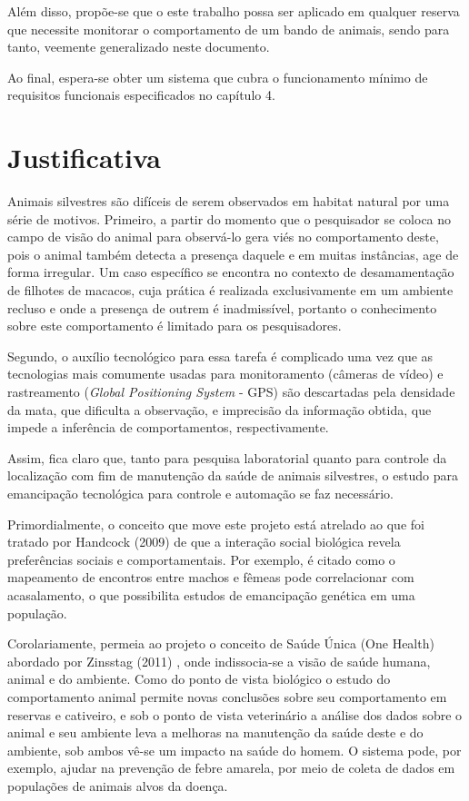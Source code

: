 Além disso, propõe-se que o este trabalho possa ser aplicado em qualquer reserva que necessite monitorar o comportamento de um bando de animais, sendo para tanto, veemente generalizado neste documento.

Ao final, espera-se obter um sistema que cubra o funcionamento mínimo de requisitos funcionais especificados no capítulo 4.

\section{Justificativa}
Animais silvestres são difíceis de serem observados em habitat natural por uma série de motivos. Primeiro, a partir do momento que o pesquisador se coloca no campo de visão do animal para observá-lo gera viés no comportamento deste, pois o animal também detecta a presença daquele e em muitas instâncias, age de forma irregular. Um caso específico se encontra no contexto de desamamentação de filhotes de macacos, cuja prática é realizada exclusivamente em um ambiente recluso e onde a presença de outrem é inadmissível, portanto o conhecimento sobre este comportamento é limitado para os pesquisadores.

Segundo, o auxílio tecnológico para essa tarefa é complicado uma vez que as tecnologias mais comumente usadas para monitoramento (câmeras de vídeo)  e rastreamento (\emph{Global Positioning System} - GPS) são descartadas pela densidade da mata, que dificulta a observação, e imprecisão da informação obtida, que impede a inferência de comportamentos, respectivamente.

Assim, fica claro que, tanto para pesquisa laboratorial quanto para controle da localização com fim de manutenção da saúde de animais silvestres, o estudo para emancipação tecnológica para controle e automação se faz necessário.

Primordialmente, o conceito que move este projeto está atrelado ao que foi tratado por Handcock (2009) \cite{handcock} de que a interação social biológica revela preferências sociais e comportamentais. Por exemplo, é citado como o mapeamento de encontros entre machos e fêmeas pode correlacionar com acasalamento, o que possibilita estudos de emancipação genética em uma população.

Corolariamente, permeia ao projeto o conceito de Saúde Única (One Health) abordado por Zinsstag (2011) \cite{zinsstag}, onde indissocia-se a visão de saúde humana, animal e do ambiente. Como do ponto de vista biológico o estudo do comportamento animal permite novas conclusões sobre seu comportamento em reservas e cativeiro, e sob o ponto de vista veterinário a análise dos dados sobre o animal e seu ambiente leva a melhoras na manutenção da saúde deste e do ambiente, sob ambos vê-se um impacto na saúde do homem. O sistema pode, por exemplo, ajudar na prevenção de febre amarela, por meio de coleta de dados em populações de animais alvos da doença.

